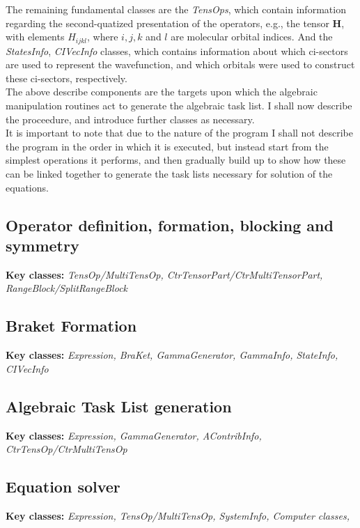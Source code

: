 \documentclass[12pt]{article}
\begin{document}
\noindent The remaining fundamental classes are the \emph{TensOps}, which contain
information regarding the second-quatized presentation of the operators, e.g.,
the tensor $\mathbf{H}$, with elements $H_{ijkl}$, where $i, j, k$ and $l$ are
molecular orbital indices. And the \emph{StatesInfo}, \emph{CIVecInfo}
classes, which contains information about which ci-sectors are used to represent the 
wavefunction, and which orbitals were used to construct these ci-sectors,  respectively.\\

\noindent The above describe components are the targets upon which the 
algebraic manipulation routines act to generate the algebraic task list.
I shall now describe the proceedure, and introduce further classes as necessary.\\

\noindent It is important to note that due to the nature of the program I shall not describe the
program in the order in which it is executed, but instead start from the simplest operations it
performs, and then gradually build up to show how these can be linked together to
generate the task lists necessary for solution of the equations.
\subsection{Operator definition, formation, blocking and symmetry } 
\textbf{Key classes:} \emph{TensOp/MultiTensOp, CtrTensorPart/CtrMultiTensorPart, RangeBlock/SplitRangeBlock}  

\subsection{Braket Formation} 
\textbf{Key classes:} \emph{Expression, BraKet, GammaGenerator, GammaInfo, StateInfo, CIVecInfo}  

\subsection{Algebraic Task List generation} 
\textbf{Key classes:} \emph{Expression, GammaGenerator, AContribInfo, CtrTensOp/CtrMultiTensOp}  

\subsection{Equation solver} 
\textbf{Key classes:} \emph{Expression, TensOp/MultiTensOp, SystemInfo, Computer classes, }  
\end{document}
